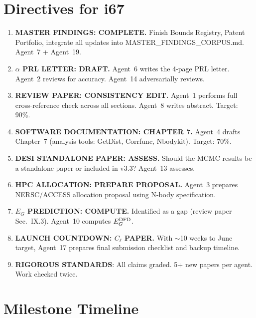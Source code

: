 \documentclass[11pt,a4paper]{article}
\begin{document}
\section{Directives for i67}
\label{sec:directives}

\begin{enumerate}
\item \textbf{MASTER FINDINGS: COMPLETE.} Finish Bounds Registry, Patent Portfolio, integrate all updates into MASTER\_FINDINGS\_CORPUS.md. Agent~7 + Agent~19.

\item \textbf{$\alpha$ PRL LETTER: DRAFT.} Agent~6 writes the 4-page PRL letter. Agent~2 reviews for accuracy. Agent~14 adversarially reviews.

\item \textbf{REVIEW PAPER: CONSISTENCY EDIT.} Agent~1 performs full cross-reference check across all sections. Agent~8 writes abstract. Target: 90\%.

\item \textbf{SOFTWARE DOCUMENTATION: CHAPTER 7.} Agent~4 drafts Chapter~7 (analysis tools: GetDist, Corrfunc, Nbodykit). Target: 70\%.

\item \textbf{DESI STANDALONE PAPER: ASSESS.} Should the MCMC results be a standalone paper or included in v3.3? Agent~13 assesses.

\item \textbf{HPC ALLOCATION: PREPARE PROPOSAL.} Agent~3 prepares NERSC/ACCESS allocation proposal using N-body specification.

\item \textbf{$E_G$ PREDICTION: COMPUTE.} Identified as a gap (review paper Sec.~IX.3). Agent~10 computes $E_G^{\rm DFD}$.

\item \textbf{LAUNCH COUNTDOWN: $C_\ell$ PAPER.} With $\sim$10 weeks to June target, Agent~17 prepares final submission checklist and backup timeline.

\item \textbf{RIGOROUS STANDARDS}: All claims graded. 5+ new papers per agent. Work checked twice.
\end{enumerate}


\section{Milestone Timeline}
\label{sec:timeline}
\end{document}
